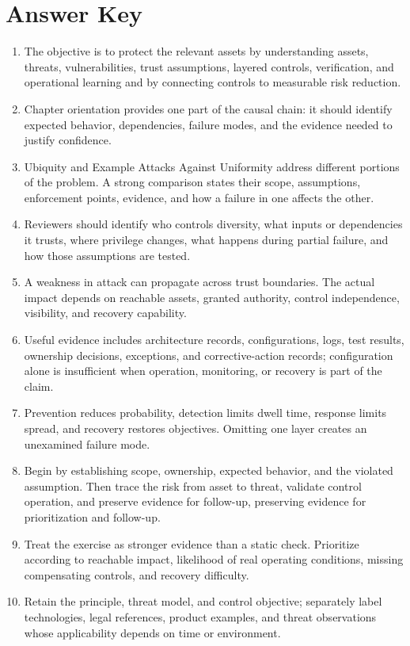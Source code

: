 \documentclass[11pt]{article}
\begin{document}
\section*{Answer Key}
\begin{enumerate}
\item The objective is to protect the relevant assets by understanding assets, threats, vulnerabilities, trust assumptions, layered controls, verification, and operational learning and by connecting controls to measurable risk reduction.
\item Chapter orientation provides one part of the causal chain: it should identify expected behavior, dependencies, failure modes, and the evidence needed to justify confidence.
\item Ubiquity and Example Attacks Against Uniformity address different portions of the problem. A strong comparison states their scope, assumptions, enforcement points, evidence, and how a failure in one affects the other.
\item Reviewers should identify who controls diversity, what inputs or dependencies it trusts, where privilege changes, what happens during partial failure, and how those assumptions are tested.
\item A weakness in attack can propagate across trust boundaries. The actual impact depends on reachable assets, granted authority, control independence, visibility, and recovery capability.
\item Useful evidence includes architecture records, configurations, logs, test results, ownership decisions, exceptions, and corrective-action records; configuration alone is insufficient when operation, monitoring, or recovery is part of the claim.
\item Prevention reduces probability, detection limits dwell time, response limits spread, and recovery restores objectives. Omitting one layer creates an unexamined failure mode.
\item Begin by establishing scope, ownership, expected behavior, and the violated assumption. Then trace the risk from asset to threat, validate control operation, and preserve evidence for follow-up, preserving evidence for prioritization and follow-up.
\item Treat the exercise as stronger evidence than a static check. Prioritize according to reachable impact, likelihood of real operating conditions, missing compensating controls, and recovery difficulty.
\item Retain the principle, threat model, and control objective; separately label technologies, legal references, product examples, and threat observations whose applicability depends on time or environment.
\end{enumerate}
\end{document}
